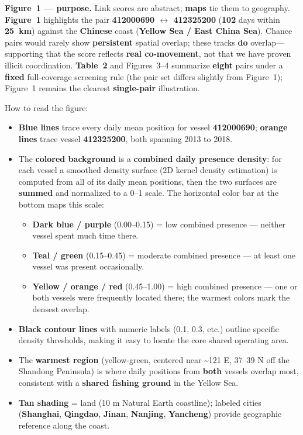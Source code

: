 \documentclass[
]{article}
\providecommand{\tightlist}{%
  \setlength{\itemsep}{0pt}\setlength{\parskip}{0pt}}
\begin{document}
\textbf{Figure~1 --- purpose.} Link scores are abstract; \textbf{maps}
tie them to geography. \textbf{Figure~1} highlights the pair
\textbf{412000690 \(\leftrightarrow\) 412325200} (\textbf{102} days
within \textbf{25~km}) against the \textbf{Chinese} coast
(\textbf{Yellow Sea / East China Sea}). Chance pairs would rarely show
\textbf{persistent} spatial overlap; these tracks \textbf{do}
overlap---supporting that the score reflects \textbf{real co-movement},
not that we have proven illicit coordination. \textbf{Table~2} and
Figures~3--4 summarize \textbf{eight} pairs under a \textbf{fixed}
full-coverage screening rule (the pair set differs slightly from
Figure~1); Figure~1 remains the clearest \textbf{single-pair}
illustration.

How to read the figure:

\begin{itemize}
\tightlist
\item
  \textbf{Blue lines} trace every daily mean position for vessel
  \textbf{412000690}; \textbf{orange lines} trace vessel
  \textbf{412325200}, both spanning 2013 to 2018.
\item
  The \textbf{colored background} is a \textbf{combined daily presence
  density}: for each vessel a smoothed density surface (2D kernel
  density estimation) is computed from all of its daily mean positions,
  then the two surfaces are \textbf{summed} and normalized to a 0--1
  scale. The horizontal color bar at the bottom maps this scale:

  \begin{itemize}
  \tightlist
  \item
    \textbf{Dark blue / purple} (0.00--0.15) = low combined presence ---
    neither vessel spent much time there.
  \item
    \textbf{Teal / green} (0.15--0.45) = moderate combined presence ---
    at least one vessel was present occasionally.
  \item
    \textbf{Yellow / orange / red} (0.45--1.00) = high combined presence
    --- one or both vessels were frequently located there; the warmest
    colors mark the densest overlap.
  \end{itemize}
\item
  \textbf{Black contour lines} with numeric labels (0.1, 0.3, etc.)
  outline specific density thresholds, making it easy to locate the core
  shared operating area.
\item
  The \textbf{warmest region} (yellow-green, centered near
  \textasciitilde121 E, 37--39 N off the Shandong Peninsula) is where
  daily positions from \textbf{both} vessels overlap most, consistent
  with a \textbf{shared fishing ground} in the Yellow Sea.
\item
  \textbf{Tan shading} = land (10 m Natural Earth coastline); labeled
  cities (\textbf{Shanghai}, \textbf{Qingdao}, \textbf{Jinan},
  \textbf{Nanjing}, \textbf{Yancheng}) provide geographic reference
  along the coast.
\end{itemize}
\end{document}
